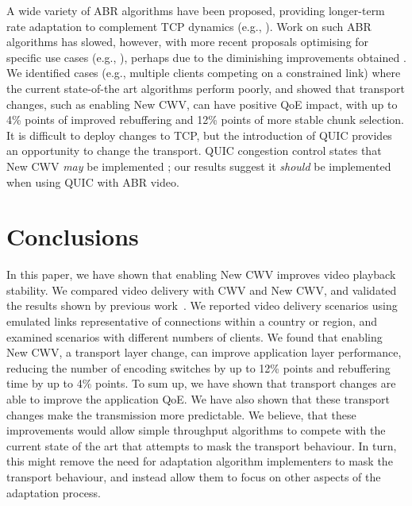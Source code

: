 \documentclass[10pt,sigconf]{acmart}
\begin{document}
A wide variety of ABR algorithms have been proposed, providing longer-term rate
adaptation to complement TCP dynamics (e.g., \cite{Sun-2016-cs2p,Jiang-2012-improving-fairness-http-video-festive,Spiteri-2016-BOLA,Huang-2015-A-buffer-based-approach-to-rate-adaptation-bba,Spiteri-2019-from-theory-to-practice-sabre,Wang-2016-squad}).
Work on such ABR algorithms has slowed, however, with more recent proposals optimising for specific use cases (e.g., \cite{Karagkioules-2020-achieving-low-latency}), perhaps due to the diminishing improvements obtained \cite{Yin-2015-a-control-theoritic-approach}. We identified cases (e.g., multiple clients competing on a constrained link) where the current state-of-the art algorithms perform poorly, and showed that transport changes, such as enabling New CWV, can have positive QoE impact, with up to 4\% points of improved rebuffering and 12\% points of more stable chunk selection. 
It is difficult to deploy changes to TCP, but the introduction of QUIC \cite{RFC9000}
provides an opportunity to change the transport. QUIC congestion control states that 
New CWV \emph{may} be implemented \cite{RFC9002}; our results suggest it \emph{should}
be implemented when using QUIC with ABR video.

\section{Conclusions}
\label{sec:conclusion}

In this paper, we have shown that enabling New CWV improves video playback stability. We compared video delivery with CWV and New CWV, and validated the results shown by previous work~\cite{Nazir-2014-performance-evaluation-congestion-window-validation-dash-newcwv}. We reported video delivery scenarios using emulated links representative of connections within a country or region, and examined scenarios with different numbers of clients. We found that enabling New CWV, a transport layer change, can improve application layer performance, reducing the number of encoding switches by up to 12\% points and rebuffering time by up to 4\% points. To sum up, we have shown that transport changes are able to improve the application QoE. We have also shown that these transport changes make the transmission more predictable. We believe, that these improvements would allow simple throughput algorithms to compete with the current state of the art that attempts to mask the transport behaviour. In turn, this might remove the need for adaptation algorithm implementers to mask the transport behaviour, and instead allow them to focus on other aspects of the adaptation process. 
\end{document}
